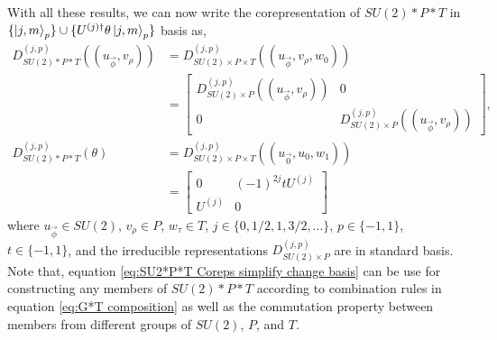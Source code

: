 \documentclass[preprint, 12pt]{revtex4-2}
\numberwithin{equation}{section}
\begin{document}
With all these results, we can now write the corepresentation of $SU(2)\ast P\ast T$ in $\{\ket{j,m}_p\}\cup\{U^{(j)\dagger}\theta\ket{j,m}_p\}$ basis as,
\begin{equation}\label{eq:SU2*P*T Coreps simplify change basis}
    \begin{aligned}
        D_{SU(2)\ast P\ast T}^{(j,p)}((u_{\vec{\phi}}, v_\rho)) &= D_{SU(2)\times P\times T}^{(j,p)}((u_{\vec{\phi}}, v_\rho, w_0)) \\
        &= \begin{bmatrix}
            D_{SU(2)\times P}^{(j,p)}((u_{\vec{\phi}}, v_\rho)) & 0 \\
                0 & D_{SU(2)\times P}^{(j,p)}((u_{\vec{\phi}}, v_\rho))  
            \end{bmatrix}, \\
        D_{SU(2)\ast P\ast T}^{(j,p)}(\theta) &= D_{SU(2)\times P\times T}^{(j,p)}((u_{\vec{0}},u_0,w_1)) \\
        &= \begin{bmatrix}
                0 & (-1)^{2j}tU^{(j)} \\
                U^{(j)} & 0 
            \end{bmatrix}
    \end{aligned}
\end{equation}
where $u_{\vec{\phi}}\in SU(2)$, $v_\rho\in P$, $w_\tau\in T$, $j\in \{0, 1/2, 1, 3/2, ...\}$, $p\in\{-1, 1\}$, $t\in\{-1, 1\}$, and the irreducible representations $D_{SU(2)\times P}^{(j,p)}$ are in standard basis. Note that, equation \ref{eq:SU2*P*T Coreps simplify change basis} can be use for constructing any members of $SU(2)\ast P\ast T$ according to combination rules in equation \ref{eq:G*T composition} as well as the commutation property between members from different groups of $SU(2)$, $P$, and $T$.
\end{document}
